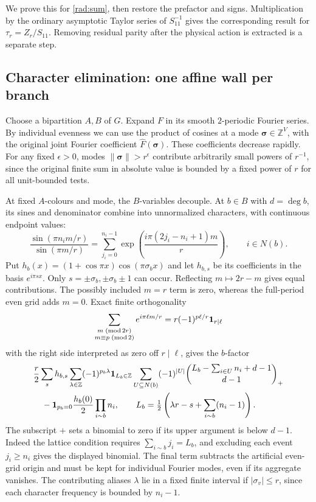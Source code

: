 We prove this for \eqref{rad:sum}, then restore the prefactor and
signs. Multiplication by the ordinary asymptotic Taylor series of
\(S_{11}^{-1}\) gives the corresponding result for \(\tau_r=Z_r/S_{11}\).
Removing residual parity after the physical action is extracted
is a separate step.

\subsection{Character elimination: one affine wall per branch}
\label{rad:elimination}

Choose a bipartition \(A,B\) of \(G\). Expand \(F\) in its smooth
\(2\)-periodic Fourier series. By individual evenness we can use
the product of cosines at a mode \(\boldsymbol\sigma\in\mathbb Z^V\),
with the original joint Fourier coefficient
\(\widehat F(\boldsymbol\sigma)\). These coefficients decrease
rapidly. For any fixed \(\epsilon>0\), modes
\(\|\boldsymbol\sigma\|>r^\epsilon\) contribute arbitrarily small
powers of \(r^{-1}\), since the original finite sum in absolute
value is bounded by a fixed power of \(r\) for all unit-bounded tests.

At fixed \(A\)-colours and mode, the \(B\)-variables decouple.
At \(b\in B\) with \(d=\deg b\), its sines and denominator combine
into unnormalized characters, with continuous endpoint values:
\[
 \frac{\sin(\pi n_i m/r)}{\sin(\pi m/r)}
  =\sum_{j_i=0}^{n_i-1}
       \exp\!\left(\frac{i\pi(2j_i-n_i+1)m}r\right),
 \qquad i\in N(b).
\]
Put \(h_b(x)=(1+\cos\pi x)\cos(\pi\sigma_b x)\) and let \(h_{b,s}\)
be its coefficients in the basis \(e^{i\pi sx}\). Only
\(s=\pm\sigma_b,\pm\sigma_b\pm1\) can occur. Reflecting
\(m\mapsto 2r-m\) gives equal contributions. The possibly included
\(m=r\) term is zero, whereas the full-period even grid adds
\(m=0\). Exact finite orthogonality
\[
 \sum_{\substack{m\;(\mathrm{mod}\,2r)\\m\equiv p\;(\mathrm{mod}\,2)}}
 e^{i\pi\ell m/r}=r(-1)^{p\ell/r}{\bf1}_{r\mid\ell}
\]
with the right side interpreted as zero off \(r\mid\ell\), gives
the \(b\)-factor
\begin{equation}
 \begin{aligned}
 &\frac r2\sum_s h_{b,s}\sum_{\lambda\in\mathbb Z}
 (-1)^{p_b\lambda}{\bf1}_{L_b\in\mathbb Z}
 \sum_{U\subseteq N(b)}(-1)^{|U|}
 \binom{L_b-\sum_{i\in U}n_i+d-1}{d-1}_{+}\\
 &\quad-{\bf1}_{p_b=0}\frac{h_b(0)}{2}\prod_{i\sim b}n_i,
 \qquad L_b=\tfrac12\left(\lambda r-s+\sum_{i\sim b}(n_i-1)\right).
 \end{aligned}
 \label{rad:alias}
\end{equation}
The subscript \(+\) sets a binomial to zero if its upper argument
is below \(d-1\). Indeed the lattice condition requires
\(\sum_{i\sim b}j_i=L_b\), and excluding each event \(j_i\ge n_i\)
gives the displayed binomial. The final term subtracts the
artificial even-grid origin and must be kept for individual
Fourier modes, even if its aggregate vanishes. The contributing
aliases \(\lambda\) lie in a fixed finite interval if
\(|\sigma_v|\le r\), since each character frequency is bounded
by \(n_i-1\).

